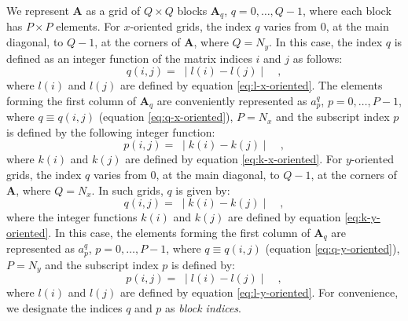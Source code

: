 \documentclass[manuscript,revised]{geophysics}
\begin{document}
We represent $\mathbf{A}$ as a grid of $Q \times Q$ blocks $\mathbf{A}_{q}$, 
$q = 0, \dots, Q - 1$, where each block has $P \times P$ elements.
For $x$-oriented grids, the index $q$ varies from $0$, at the main diagonal,
to $Q - 1$, at the corners of $\mathbf{A}$, where $Q = N_{y}$.
In this case, the index $q$ is defined as an integer function
of the matrix indices $i$ and $j$ as follows:
\begin{equation}
q(i, j) = \; \mid l(i) - l(j) \mid \quad ,
\label{eq:q-x-oriented}
\end{equation}
where $l(i)$ and $l(j)$ are defined by equation \ref{eq:l-x-oriented}.
The elements forming the first column of $\mathbf{A}_{q}$ are conveniently 
represented as $a^{q}_{p}$, $p = 0, \dots, P - 1$, where $q \equiv q(i, j)$ 
(equation \ref{eq:q-x-oriented}), $P = N_{x}$ and the subscript index $p$ is defined by 
the following integer function:
\begin{equation}
p(i, j) = \; \mid k(i) - k(j) \mid \quad ,
\label{eq:p-x-oriented}
\end{equation}
where $k(i)$ and $k(j)$ are defined by equation \ref{eq:k-x-oriented}.
For $y$-oriented grids, the index $q$ varies from $0$, at the main diagonal,
to $Q - 1$, at the corners of $\mathbf{A}$, where $Q = N_{x}$.
In such grids, $q$ is given by:
\begin{equation}
q(i, j) = \; \mid k(i) - k(j) \mid \quad ,
\label{eq:q-y-oriented}
\end{equation}
where the integer functions $k(i)$ and $k(j)$ are defined by equation \ref{eq:k-y-oriented}.
In this case, the elements forming the first column of $\mathbf{A}_{q}$ are 
represented as $a^{q}_{p}$, $p = 0, \dots, P - 1$, where $q \equiv q(i, j)$ 
(equation \ref{eq:q-y-oriented}), $P = N_{y}$ and the subscript index $p$ is defined by:
\begin{equation}
p(i, j) = \; \mid l(i) - l(j) \mid \quad ,
\label{eq:p-y-oriented}
\end{equation}
where $l(i)$ and $l(j)$ are defined by equation \ref{eq:l-y-oriented}.
For convenience, we designate the indices $q$ and $p$ as \textit{block indices}.
\end{document}
